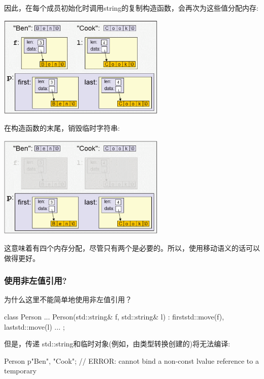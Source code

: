 因此，在每个成员初始化时调用string的复制构造函数，会再次为这些值分配内存:

\begin{center}
	\includegraphics[width=0.6\textwidth]{part1/ch4/images/2}
\end{center}

在构造函数的末尾，销毁临时字符串:

\begin{center}
	\includegraphics[width=0.6\textwidth]{part1/ch4/images/3}
\end{center}

这意味着有四个内存分配，尽管只有两个是必要的。所以，使用移动语义的话可以做得更好。

\subsubsection{使用非左值引用?}

为什么这里不能简单地使用非左值引用？

\begin{cppcode}
class Person {
	...
	Person(std::string& f, std::string& l)
	: first{std::move(f)}, last{std::move(l)} {
	}
	...
};
\end{cppcode}

但是，传递 std::string和临时对象(例如，由类型转换创建的)将无法编译:

\begin{cppcode}
Person p{"Ben", "Cook"}; // ERROR: cannot bind a non-const lvalue reference to a temporary
\end{cppcode}

